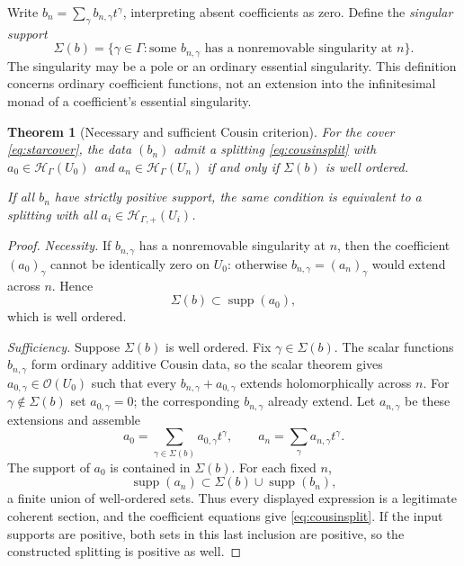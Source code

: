 \documentclass[11pt,letterpaper]{article}
\newtheorem{theorem}{Theorem}[section]
\theoremstyle{definition}
\theoremstyle{remark}
\newcommand{\OO}{\mathcal O}
\newcommand{\HH}{\mathscr H_\Gamma}
\newcommand{\HP}{\mathscr H_{\Gamma,+}}
\newcommand{\supp}{\operatorname{supp}}
\numberwithin{equation}{section}
\begin{document}
Write $b_n=\sum_\gamma b_{n,\gamma}t^\gamma$, interpreting absent coefficients as zero. Define the \emph{singular support}
\begin{equation}\label{eq:singularsupport}
 \Sigma(b)=\{\gamma\in\Gamma:
 \text{some }b_{n,\gamma}\text{ has a nonremovable singularity at }n\}.
\end{equation}
The singularity may be a pole or an ordinary essential singularity. This definition concerns ordinary coefficient functions, not an extension into the infinitesimal monad of a coefficient's essential singularity.

\begin{theorem}[Necessary and sufficient Cousin criterion]\label{thm:cousincriterion}
For the cover \eqref{eq:starcover}, the data $(b_n)$ admit a splitting \eqref{eq:cousinsplit} with $a_0\in\HH(U_0)$ and $a_n\in\HH(U_n)$ if and only if $\Sigma(b)$ is well ordered.

If all $b_n$ have strictly positive support, the same condition is equivalent to a splitting with all $a_i\in\HP(U_i)$.
\end{theorem}
\begin{proof}
\emph{Necessity.} If $b_{n,\gamma}$ has a nonremovable singularity at $n$, then the coefficient $(a_0)_\gamma$ cannot be identically zero on $U_0$: otherwise $b_{n,\gamma}=(a_n)_\gamma$ would extend across $n$. Hence
\[
 \Sigma(b)\subset\supp(a_0),
\]
which is well ordered.

\emph{Sufficiency.} Suppose $\Sigma(b)$ is well ordered. Fix $\gamma\in\Sigma(b)$. The scalar functions $b_{n,\gamma}$ form ordinary additive Cousin data, so the scalar theorem gives $a_{0,\gamma}\in\OO(U_0)$ such that every $b_{n,\gamma}+a_{0,\gamma}$ extends holomorphically across $n$. For $\gamma\notin\Sigma(b)$ set $a_{0,\gamma}=0$; the corresponding $b_{n,\gamma}$ already extend. Let $a_{n,\gamma}$ be these extensions and assemble
\[
 a_0=\sum_{\gamma\in\Sigma(b)}a_{0,\gamma}t^\gamma,
 \qquad a_n=\sum_\gamma a_{n,\gamma}t^\gamma.
\]
The support of $a_0$ is contained in $\Sigma(b)$. For each fixed $n$,
\[
 \supp(a_n)\subset\Sigma(b)\cup\supp(b_n),
\]
a finite union of well-ordered sets. Thus every displayed expression is a legitimate coherent section, and the coefficient equations give \eqref{eq:cousinsplit}. If the input supports are positive, both sets in this last inclusion are positive, so the constructed splitting is positive as well.
\end{proof}
\end{document}
